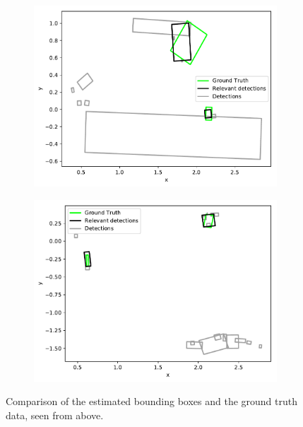 \begin{figure}[h!]
    \centering
    \begin{subfigure}[c]{0.75\textwidth}
        \includegraphics[width=\textwidth]{../Material/iou0.pdf}
        \subcaption{}
        \label{fig:eval:iou:0}
    \end{subfigure}

    \begin{subfigure}[c]{0.75\textwidth}
        \includegraphics[width=\textwidth]{../Material/iou2.pdf}
        \subcaption{}
        \label{fig:eval:iou:2}
    \end{subfigure}
    \caption{Comparison of the estimated bounding boxes and the ground truth data, seen from above.}
    \label{fig:eval:iou}
\end{figure}

